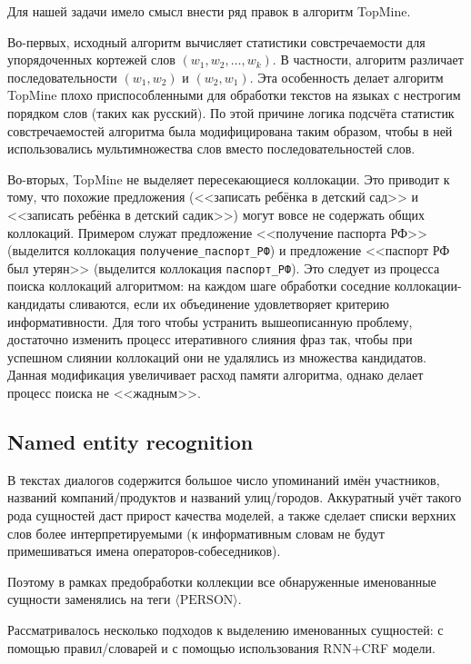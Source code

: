 Для нашей задачи имело смысл внести ряд правок в алгоритм TopMine.

Во-первых, исходный алгоритм вычисляет статистики совстречаемости для упорядоченных кортежей слов $(w_1, w_2, \dots, w_k)$. В частности, алгоритм различает последовательности $(w_1, w_2)$ и $(w_2, w_1)$. Эта особенность делает алгоритм TopMine плохо приспособленными для обработки текстов на языках с нестрогим порядком слов (таких как русский). По этой причине логика подсчёта статистик совстречаемостей алгоритма была модифицирована таким образом, чтобы в ней использовались мультимножества слов вместо последовательностей слов.

Во-вторых, TopMine не выделяет пересекающиеся коллокации. Это приводит к тому, что похожие предложения (<<записать ребёнка в детский сад>> и <<записать ребёнка в детский садик>>) могут вовсе не содержать общих коллокаций. Примером служат предложение <<получение паспорта РФ>> (выделится коллокация \texttt{получение\_паспорт\_РФ}) и предложение <<паспорт РФ был утерян>> (выделится коллокация \texttt{паспорт\_РФ}). Это следует из процесса поиска коллокаций алгоритмом: на каждом шаге обработки соседние коллокации-кандидаты сливаются, если их объединение удовлетворяет критерию информативности. Для того чтобы устранить вышеописанную проблему, достаточно изменить процесс итеративного слияния фраз так, чтобы при успешном слиянии коллокаций они не удалялись из множества кандидатов. Данная модификация увеличивает расход памяти алгоритма, однако делает процесс поиска не <<жадным>>.

\subsection{Named entity recognition}

\par В текстах диалогов содержится большое число упоминаний имён участников, названий компаний/продуктов и названий улиц/городов. Аккуратный учёт такого рода сущностей даст прирост качества моделей, а также сделает списки верхних слов более интерпретируемыми (к информативным словам не будут примешиваться имена операторов-собеседников).

Поэтому в рамках предобработки коллекции все обнаруженные именованные сущности заменялись на теги $\langle \mathrm{PERSON} \rangle$.

Рассматривалось несколько подходов к выделению именованных сущностей: с помощью правил/словарей и с помощью использования RNN+CRF модели.

